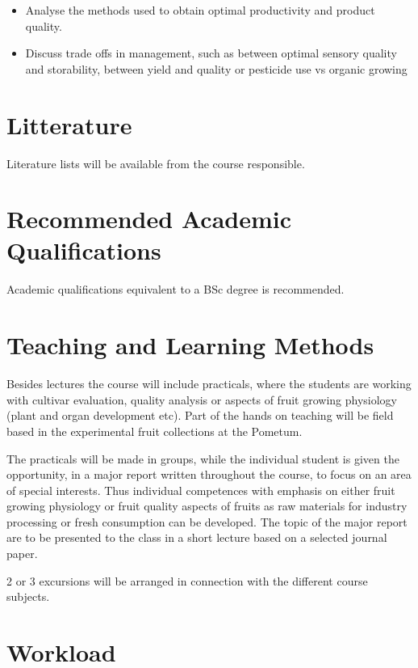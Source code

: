 \begin{itemize}
    \item Analyse the methods used to obtain optimal productivity and product quality.
    \item Discuss trade offs in management, such as between optimal sensory quality and storability, between yield and quality or pesticide use vs organic growing
\end{itemize}


\section*{Litterature}
Literature lists will be available from the course responsible.


\section*{Recommended Academic Qualifications}
Academic qualifications equivalent to a BSc degree is recommended.


\section*{Teaching and Learning Methods}
Besides lectures the course will include practicals, where the students are working with cultivar evaluation, quality analysis or aspects of fruit growing physiology (plant and organ development etc). Part of the hands on teaching will be field based in the experimental fruit collections at the Pometum.

\vspace*{1em}
The practicals will be made in groups, while the individual student is given the opportunity, in a major report written throughout the course, to focus on an area of special interests. Thus individual competences with emphasis on either fruit growing physiology or fruit quality aspects of fruits as raw materials for industry processing or fresh consumption can be developed. The topic of the major report are to be presented to the class in a short lecture based on a selected journal paper.
\vspace*{1em}

2 or 3 excursions will be arranged in connection with the different course subjects.

\section*{Workload}

